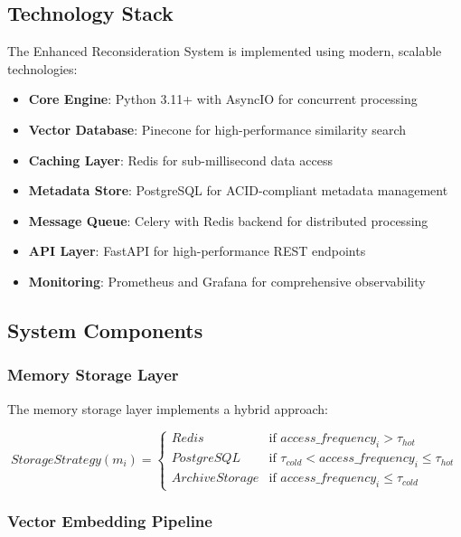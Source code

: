 \documentclass[12pt,a4paper]{article}
\begin{document}
\subsection{Technology Stack}

The Enhanced Reconsideration System is implemented using modern, scalable technologies:

\begin{itemize}
\item \textbf{Core Engine}: Python 3.11+ with AsyncIO for concurrent processing
\item \textbf{Vector Database}: Pinecone for high-performance similarity search
\item \textbf{Caching Layer}: Redis for sub-millisecond data access
\item \textbf{Metadata Store}: PostgreSQL for ACID-compliant metadata management
\item \textbf{Message Queue}: Celery with Redis backend for distributed processing
\item \textbf{API Layer}: FastAPI for high-performance REST endpoints
\item \textbf{Monitoring}: Prometheus and Grafana for comprehensive observability
\end{itemize}

\subsection{System Components}

\subsubsection{Memory Storage Layer}

The memory storage layer implements a hybrid approach:

\begin{equation}
StorageStrategy(m_i) = \begin{cases}
Redis & \text{if } access\_frequency_i > \tau_{hot} \\
PostgreSQL & \text{if } \tau_{cold} < access\_frequency_i \leq \tau_{hot} \\
ArchiveStorage & \text{if } access\_frequency_i \leq \tau_{cold}
\end{cases}
\end{equation}

\subsubsection{Vector Embedding Pipeline}
\end{document}
